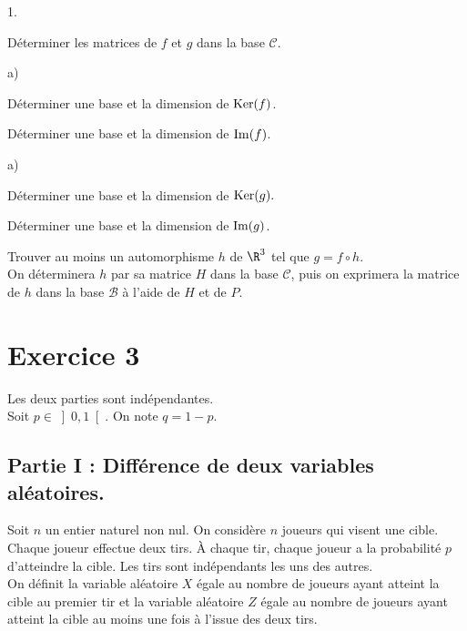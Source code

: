 \documentclass[11pt]{article}%
\begin{document}
\begin{noliste}{1.}
 \setlength{\itemsep}{4mm}
\item Déterminer les matrices de $f$ et $g$ dans la base $\mathcal{C}$.

\item
\begin{noliste}{a)}
 \setlength{\itemsep}{2mm}
\item Déterminer une base et la dimension de $\operatorname{Ker} (f) $.

\item Déterminer une base et la dimension de $\operatorname{Im} (f) $.
\end{noliste}

\item
\begin{noliste}{a)}
 \setlength{\itemsep}{2mm}
\item Déterminer une base et la dimension de $\operatorname{Ker} (g).$

\item Déterminer une base et la dimension de $\operatorname{Im}(g) 
$.
\end{noliste}

\item Trouver au moins un automorphisme $h$ de $\R^{3}$ tel que
$g = f\circ h$.\\
On déterminera $h$ par sa matrice $H$ dans la base $\mathcal{C}$, puis
on exprimera la matrice de $h$ dans la base $\mathcal{B}$ à l'aide de 
$H$ et de $P$.
\end{noliste}

\newpage

\section*{Exercice 3}

\noindent
Les deux parties sont indépendantes.\\
Soit $p\in \left] 0,1\right[.$ On note $q = 1-p.$

\subsection*{Partie I : Différence de deux variables aléatoires.}

\noindent
Soit $n$ un entier naturel non nul. On considère $n$ joueurs qui visent
une cible. Chaque joueur effectue deux tirs. À chaque tir, chaque
joueur a la probabilité $p$ d'atteindre la cible. Les tirs sont 
indépendants les uns des autres.\\
On définit la variable aléatoire $X$ égale au nombre de joueurs
ayant atteint la cible au premier tir et la variable aléatoire $Z$
égale au nombre de joueurs ayant atteint la cible au moins une fois à
l'issue des deux tirs.
\end{document}
